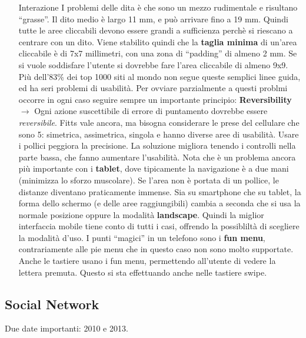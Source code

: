 \begin{enumerate}
\item[Interazione] I problemi delle dita \`e che sono un mezzo rudimentale e risultano ``grasse''. Il dito medio \`e largo 11 mm, e pu\`o arrivare fino a 19 mm. Quindi tutte le aree cliccabili devono essere grandi a sufficienza perch\`e si riescano a centrare con un dito. Viene stabilito quindi che la \textbf{taglia minima} di un'area cliccabile \`e di 7x7 millimetri, con una zona di ``padding'' di almeno 2 mm. Se si vuole soddisfare l'utente si dovrebbe fare l'area cliccabile di almeno 9x9. Pi\`u dell'83\% dei top 1000 siti al mondo non segue queste semplici linee guida, ed ha seri problemi di usabilit\`a. Per ovviare parzialmente a questi problmi occorre in ogni caso seguire sempre un importante principio: \textbf{Reversibility} $\to$ Ogni azione suscettibile di errore di puntamento dovrebbe essere \textit{reversibile}.
  Fitts vale ancora, ma bisogna considerare le prese del cellulare che sono 5: simetrica, assimetrica, singola e hanno diverse aree di usabilit\`a. Usare i pollici peggiora la precisione. La soluzione migliora tenendo i controlli nella parte bassa, che fanno aumentare l'usabilit\`a. Nota che \`e un problema ancora pi\`u importante con i \textbf{tablet}, dove tipicamente la navigazione \`e a due mani (minimizza lo sforzo muscolare). Se l'area non \`e portata di un pollice, le distanze diventano praticamente immense. Sia su smartphone che su tablet, la forma dello schermo (e delle aree raggiungibili) cambia a seconda che si usa la normale posizione oppure la modalit\`a \textbf{landscape}. Quindi la miglior interfaccia mobile tiene conto di tutti i casi, offrendo la possiblilt\`a di scegliere la modalit\`a d'uso. I punti ``magici'' in un telefono sono i \textbf{fun menu}, contrariamente alle pie menu che in questo caso non sono molto supportate. Anche le tastiere usano i fun menu, permettendo all'utente di vedere la lettera premuta. Questo si sta effettuando anche nelle tastiere swipe.

\end{enumerate}

\subsection{Social Network}

Due date importanti: 2010 e 2013.

